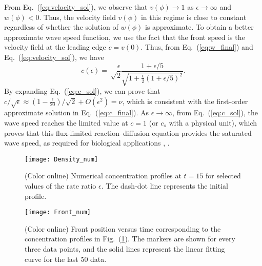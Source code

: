 \documentclass[jkps,preprint,fleqn,showpacs,showkeys]{revtex4}
\newcommand{\Fig}[1]{Fig.~(\ref{#1})}
\newcommand{\eq}[1]{Eq.~(\ref{#1})}
\newcommand{\Order}[1]{O(#1)}
\begin{document}
From \eq{eq:velocity_sol}, we observe that $v(\phi) \to 1$ as $\epsilon \to \infty$ and $w(\phi) < 0$. Thus, the velocity field $v(\phi)$ in this regime is close to constant regardless of whether the solution of $w(\phi)$ is approximate. To obtain a better approximate wave speed function, we use the fact that the front speed is the velocity field at the leading edge $c=v(0)$. Thus, from \eq{eq:w_final} and \eq{eq:velocity_sol}, we have
\begin{equation}\label{eq:c_sol}
c(\epsilon) = \sqrt\frac{\epsilon }{2}\frac{1+\epsilon/5}{\sqrt{1+\frac{\epsilon}{2}\left(1+\epsilon/5\right)^2}}.
\end{equation}
By expanding \eq{eq:c_sol}, we can prove that $c/\sqrt\epsilon \approx \left(1-\frac{\epsilon}{20}\right)/\sqrt 2 + \Order{\epsilon^2} = \nu$, which is consistent with the first-order approximate solution in \eq{eq:c_final}. As $\epsilon \to \infty$, from \eq{eq:c_sol}, the wave speed reaches the limited value at $c=1$ (or $c_s$ with a physical unit), which proves that this flux-limited reaction--diffusion equation provides the saturated wave speed, as required for biological applications \cite{Verbeni2013morphogenetic}, \cite{Sanchez2015modeling}.

\begin{figure}[h]
\centering\texttt{[image: Density\_num]}
\caption{\label{fig:num_density}
(Color online) Numerical concentration profiles at $t=15$ for selected values of the rate ratio $\epsilon$. The dash-dot line represents the initial profile. 
}
\end{figure}

\begin{figure}[h]
\centering\texttt{[image: Front\_num]}
\caption{\label{fig:num_front}
(Color online) Front position versus time corresponding to the concentration profiles in \Fig{fig:num_density}. The markers are shown for every three data points, and the solid lines represent the linear fitting curve for the last 50 data.
}
\end{figure}

\end{document}
